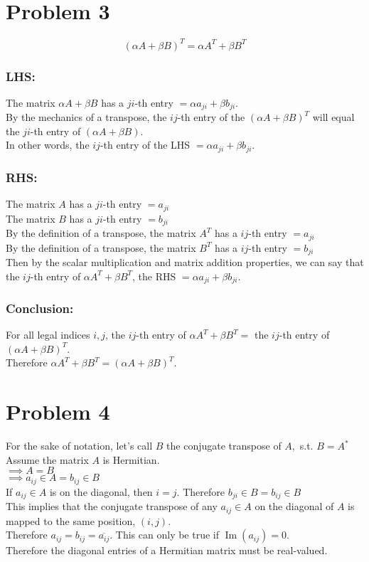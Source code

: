 \documentclass[fleqn]{article}
\begin{document}
\section*{Problem 3}
\begin{equation*}
    (\alpha A + \beta B)^T=\alpha A^T +\beta B^T
\end{equation*}
\subsubsection*{LHS:}
The matrix $\alpha A + \beta B$ has a $ji$-th entry $=\alpha a_{ji} + \beta b_{ji}$.\\  
By the mechanics of a transpose, the $ij$-th entry of the $(\alpha A + \beta B)^T$ will equal the $ji$-th entry of $(\alpha A + \beta B)$.\\
In other words, the $ij$-th entry of the LHS
$=\alpha a_{ji} + \beta b_{ji}.$

\subsubsection*{RHS:}
The matrix $A$ has a $ji$-th entry $= a_{ji}$\\
The matrix $ B$ has a $ji$-th entry $= b_{ji}$\\
By the definition of a transpose, the matrix $A^T$ has a $ij$-th entry $= a_{ji}$\\
By the definition of a transpose, the matrix $B^T$ has a $ij$-th entry $= b_{ji}$\\
Then by the scalar multiplication and matrix addition properties, we can say that the $ij$-th entry of $\alpha A^T +\beta B^T$, the RHS $ = \alpha a_{ji}+\beta b_{ji}.$

\subsubsection*{Conclusion:}
For all legal indices $i,j$, the $ij$-th entry of $\alpha A^T +\beta B^T =$ the $ij$-th entry of $(\alpha A + \beta B)^T$.\\
Therefore $\alpha A^T +\beta B^T = (\alpha A + \beta B)^T$.

\section*{Problem 4}
For the sake of notation, let's call $B$ the conjugate transpose of $A, $ s.t. $ B = A^{*}$\\
Assume the matrix $A$ is Hermitian.\\ 
$\implies A=B$\\
$\implies a_{ij}\in A = b_{ij} \in B$\\
If $a_{ij} \in A$ is on the diagonal, then $i=j$.  Therefore $b_{ji} \in B=b_{ij} \in B$\\
This implies that the conjugate transpose of any $a_{ij}\in A$ on the diagonal of $A$ is mapped to the same position, $(i,j)$.\\
Therefore $a_{ij}=b_{ij}=\overline{a_{ij}}.$  This can only be true if $\operatorname{Im}(a_{ij})=0.$\\
Therefore the diagonal entries of a Hermitian matrix must be real-valued.
\end{document}
